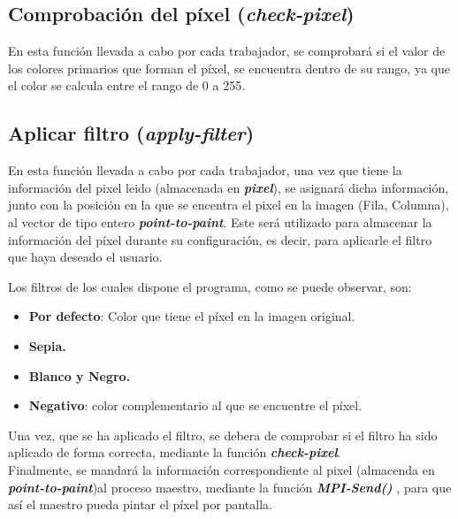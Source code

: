\documentclass[11pt]{article}
\newif\ifspanish %
\begin{document}
\subsection{Comprobación del píxel (\textit{check-pixel})}
En esta función llevada a cabo por cada trabajador, se comprobará si el valor de los colores primarios que forman el píxel, se encuentra dentro de su rango, ya que el color se calcula entre el rango de 0 a 255.
 


\subsection{Aplicar filtro (\textit{apply-filter})}
En esta función llevada a cabo por cada trabajador, una vez que tiene la información del pixel leido (almacenada en \textbf{\textit{pixel}}), se asignará dicha información, junto con la posición en la que se encentra el pixel en la imagen (Fila, Columna), al vector de tipo entero \textit{\textbf{point-to-paint}}. Este será utilizado para almacenar la información del píxel durante su configuración, es decir, para aplicarle el filtro que haya deseado el usuario.

Los filtros de los cuales dispone el programa, como se puede observar, son:
\begin{itemize}
	\item \textbf{Por defecto}: Color que tiene el píxel en la imagen original.
	\item \textbf{Sepia.}
	\item \textbf{Blanco y Negro.}
	\item \textbf{Negativo}: color complementario al que se encuentre el píxel.
\end{itemize}

Una vez, que se ha aplicado el filtro, se debera de comprobar si el filtro ha sido aplicado de forma correcta, mediante la función \textit{\textbf{check-pixel}}.\\
Finalmente, se mandará la información correspondiente al pixel (almacenda en \textit{\textbf{point-to-paint}})al proceso maestro, mediante la función \textbf{\textit{MPI-Send()}} \cite{org}, para que así el maestro pueda pintar el píxel por pantalla.



\newpage




\ifspanish
	\addcontentsline{toc}{section}{Referencias}
\else
\fi
\end{document}
